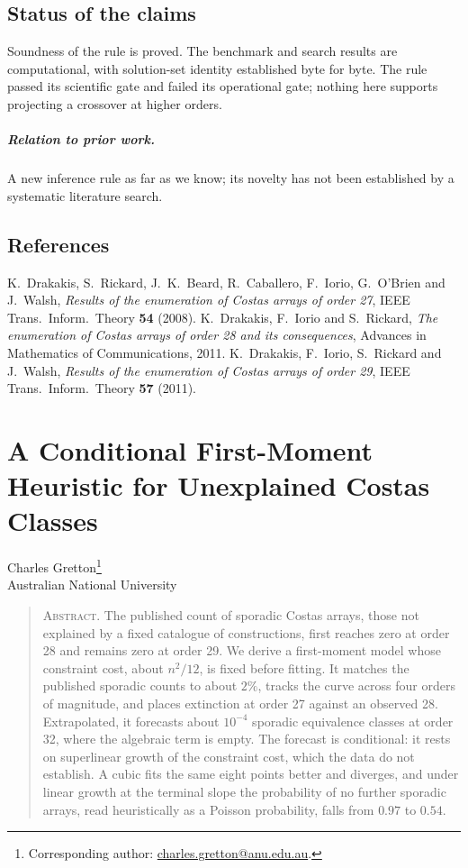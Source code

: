 \documentclass[11pt,a4paper,oneside]{report}
\makeatletter
\theoremstyle{definition}
\newcommand{\paperauthor}{\begin{center}\large Charles Gretton\footnote{Corresponding author: \href{mailto:charles.gretton@anu.edu.au}{charles.gretton@anu.edu.au}.}\\[2pt]\normalsize Australian National University\end{center}\vspace{0.5em}}
\newcommand{\paperabstract}[1]{\begin{quote}\small\noindent\textsc{Abstract.} #1\end{quote}\vspace{0.5em}}
\newenvironment{paperrefs}{\section*{References}\list{\@biblabel{\@arabic\c@enumiv}}{\settowidth\labelwidth{\@biblabel{99}}\leftmargin\labelwidth\advance\leftmargin\labelsep\usecounter{enumiv}\let\p@enumiv\@empty\renewcommand\theenumiv{\@arabic\c@enumiv}}\sloppy\small}{\endlist}
\makeatother
\begin{document}
\section{Status of the claims}\label{p5-sec:status}
Soundness of the rule is proved. The benchmark and search results are computational, with
solution-set identity established byte for byte. The rule passed its scientific gate and failed its
operational gate; nothing here supports projecting a crossover at higher orders.

\paragraph{Relation to prior work.} A new inference rule as far as we know; its novelty has not been established by a systematic literature search.
\begin{paperrefs}
 K.~Drakakis, S.~Rickard, J.~K.~Beard, R.~Caballero,
F.~Iorio, G.~O'Brien and J.~Walsh, \emph{Results of the enumeration of Costas
arrays of order 27}, IEEE Trans.\ Inform.\ Theory \textbf{54} (2008).
 K.~Drakakis, F.~Iorio and S.~Rickard, \emph{The enumeration of Costas arrays of order 28 and its consequences}, Advances in Mathematics of Communications, 2011.
 K.~Drakakis, F.~Iorio, S.~Rickard and J.~Walsh,
\emph{Results of the enumeration of Costas arrays of order 29}, IEEE Trans.\
Inform.\ Theory \textbf{57} (2011).
\end{paperrefs}

\clearpage
\chapter{A Conditional First-Moment Heuristic for Unexplained Costas Classes}\label{p6-paper}
\paperauthor
\paperabstract{The published count of sporadic Costas arrays, those not explained by a fixed catalogue of constructions, first reaches zero at order 28 and remains zero at order 29. We derive a first-moment
model whose constraint cost, about $n^2/12$, is fixed before fitting. It matches the published
sporadic counts to about $2\%$, tracks the curve across four orders of magnitude, and places
extinction at order 27 against an observed 28. Extrapolated, it forecasts about $10^{-4}$ sporadic
equivalence classes at order 32, where the algebraic term is empty. The forecast is conditional: it
rests on superlinear growth of the constraint cost, which the data do not establish. A cubic fits the
same eight points better and diverges, and under linear growth at the terminal slope the probability of no further sporadic arrays, read heuristically as a Poisson probability, falls from $0.97$ to $0.54$.}
\end{document}
